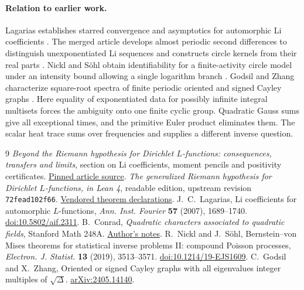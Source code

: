 \documentclass[11pt]{article}
\begin{document}
\paragraph{Relation to earlier work.}
Lagarias establishes starred convergence and asymptotics for automorphic
Li coefficients \cite{lagarias}. The merged article develops almost
periodic second differences to distinguish unexponentiated Li sequences
and constructs circle kernels from their real parts \cite{article}.
Nickl and S\"ohl obtain identifiability for a finite-activity circle
model under an intensity bound allowing a single logarithm branch
\cite{nickl}. Godsil and Zhang characterize square-root spectra of
finite periodic oriented and signed Cayley graphs \cite{godsil}.
Here equality of exponentiated data for possibly infinite integral
multisets forces the ambiguity onto one finite cyclic group. Quadratic
Gauss sums give all exceptional times, and the primitive Euler product
eliminates them. The scalar heat trace sums over frequencies and supplies
a different inverse question.

\begin{thebibliography}{9}\small
{} \emph{Beyond the Riemann hypothesis for Dirichlet
$L$-functions: consequences, transfers and limits}, section on Li
coefficients, moment pencils and positivity certificates.
\href{https://github.com/VladimirReshetnikov/ProveIt/blob/b6253012cf30c80a989c871906e097a27f23a27c/Analysis/GeneralizedRiemannHypothesis/Article/sections/li.tex}{Pinned article source}.
 \emph{The generalized Riemann hypothesis for Dirichlet
$L$-functions, in Lean 4}, readable edition, upstream revision
\texttt{72fead102f66}.
\href{https://github.com/VladimirReshetnikov/ProveIt/blob/b6253012cf30c80a989c871906e097a27f23a27c/Analysis/GeneralizedRiemannHypothesis/vendor/grh-lean/grh/src/Main.lean}{Vendored theorem declarations}.
 J.~C.~Lagarias, Li coefficients for automorphic
$L$-functions, \emph{Ann. Inst. Fourier} \textbf{57} (2007), 1689--1740.
\href{https://doi.org/10.5802/aif.2311}{doi:10.5802/aif.2311}.
 B.~Conrad, \emph{Quadratic characters associated to
quadratic fields}, Stanford Math 248A.
\href{https://math.stanford.edu/~conrad/248APage/handouts/quadchar.pdf}{Author's notes}.
 R.~Nickl and J.~S\"ohl, Bernstein--von Mises theorems for
statistical inverse problems II: compound Poisson processes,
\emph{Electron. J. Statist.} \textbf{13} (2019), 3513--3571.
\href{https://doi.org/10.1214/19-EJS1609}{doi:10.1214/19-EJS1609}.
 C.~Godsil and X.~Zhang, Oriented or signed Cayley graphs
with all eigenvalues integer multiples of $\sqrt\Delta$.
\href{https://arxiv.org/abs/2405.14140}{arXiv:2405.14140}.
\end{thebibliography}
\end{document}
